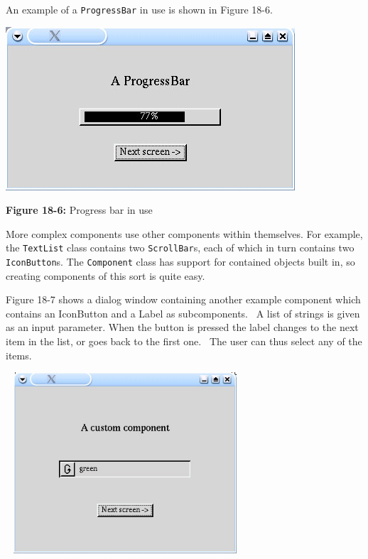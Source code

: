 An example of a \texttt{ProgressBar} in use is shown in Figure 18-6.

\begin{center}
\includegraphics[width=4.2398in,height=2.3953in]{ub-img/ub-img55.jpg}
\end{center}

{\sffamily\bfseries Figure 18-6:}
{\sffamily Progress bar in use}

More complex components use other components within themselves. For
example, the \texttt{TextList} class contains two \texttt{ScrollBar}s,
each of which in turn contains two \texttt{IconButton}s. The
\texttt{Component} class has support for contained objects built in, so
creating components of this sort is quite easy.

Figure 18-7 shows a dialog window containing another example component
which contains an IconButton and a Label as subcomponents. \ A list of
strings is given as an input parameter. When the button is pressed the
label changes to the next item in the list, or goes back to the first
one. \ The user can thus select any of the items.

\begin{center}
\includegraphics[width=3.4992in,height=2.6543in]{ub-img/ub-img56.jpg}
\end{center}

